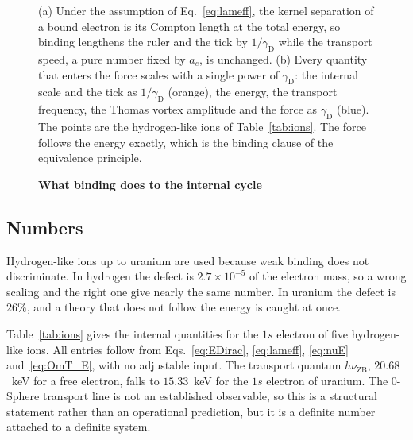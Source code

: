 \documentclass[%
 reprint, amsmath,amssymb, aps, prb, ]{revtex4-2}
\numberwithin{equation}{section}
\newcommand{\nuZB}{\nu_{\text{ZB}}}
\newcommand{\gammaD}{\gamma_{\text{D}}}
\begin{document}
\begin{figure}[t!]
\caption{\textbf{What binding does to the internal cycle}}
\label{fig:ruler}
\vspace{0.4em}
\begin{minipage}{0.95\textwidth}
\justifying\small
(a) Under the assumption of Eq.~\eqref{eq:lameff}, the kernel separation of a bound electron is its Compton length at the total energy, so binding lengthens the ruler and the tick by $1/\gammaD$ while the transport speed, a pure number fixed by $a_e$, is unchanged. (b) Every quantity that enters the force scales with a single power of $\gammaD$: the internal scale and the tick as $1/\gammaD$ (orange), the energy, the transport frequency, the Thomas vortex amplitude and the force as $\gammaD$ (blue). The points are the hydrogen-like ions of Table~\ref{tab:ions}. The force follows the energy exactly, which is the binding clause of the equivalence principle.
\end{minipage}
\end{figure}

\subsection{Numbers}
\label{subsec:bound_numbers}

Hydrogen-like ions up to uranium are used because weak binding does not discriminate. In hydrogen the defect is $2.7\times10^{-5}$ of the electron mass, so a wrong scaling and the right one give nearly the same number. In uranium the defect is $26\%$, and a theory that does not follow the energy is caught at once.

Table~\ref{tab:ions} gives the internal quantities for the $1s$ electron of five hydrogen-like ions. All entries follow from Eqs.~\eqref{eq:EDirac}, \eqref{eq:lameff}, \eqref{eq:nuE} and~\eqref{eq:OmT_E}, with no adjustable input. The transport quantum $h\nuZB$, $20.68$~keV for a free electron, falls to $15.33$~keV for the $1s$ electron of uranium. The 0-Sphere transport line is not an established observable, so this is a structural statement rather than an operational prediction, but it is a definite number attached to a definite system.
\end{document}
